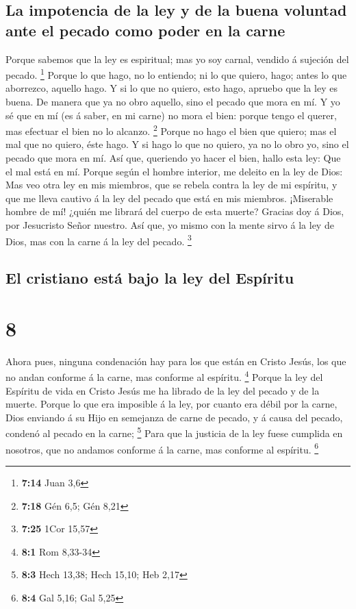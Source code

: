\hypertarget{la-impotencia-de-la-ley-y-de-la-buena-voluntad-ante-el-pecado-como-poder-en-la-carne}{%
\subsection{La impotencia de la ley y de la buena voluntad ante el
pecado como poder en la
carne}\label{la-impotencia-de-la-ley-y-de-la-buena-voluntad-ante-el-pecado-como-poder-en-la-carne}}

 Porque sabemos que la ley es espiritual; mas yo soy
carnal, vendido á sujeción del pecado. \footnote{\textbf{7:14} Juan 3,6}
 Porque lo que hago, no lo entiendo; ni lo que quiero,
hago; antes lo que aborrezco, aquello hago.  Y si lo que no
quiero, esto hago, apruebo que la ley es buena.  De manera
que ya no obro aquello, sino el pecado que mora en mí.  Y
yo sé que en mí (es á saber, en mi carne) no mora el bien: porque tengo
el querer, mas efectuar el bien no lo alcanzo. \footnote{\textbf{7:18}
  Gén 6,5; Gén 8,21}  Porque no hago el bien que quiero;
mas el mal que no quiero, éste hago.  Y si hago lo que no
quiero, ya no lo obro yo, sino el pecado que mora en mí. 
Así que, queriendo yo hacer el bien, hallo esta ley: Que el mal está en
mí.  Porque según el hombre interior, me deleito en la ley
de Dios:  Mas veo otra ley en mis miembros, que se rebela
contra la ley de mi espíritu, y que me lleva cautivo á la ley del pecado
que está en mis miembros.  ¡Miserable hombre de mí! ¿quién
me librará del cuerpo de esta muerte?  Gracias doy á Dios,
por Jesucristo Señor nuestro. Así que, yo mismo con la mente sirvo á la
ley de Dios, mas con la carne á la ley del pecado. \footnote{\textbf{7:25}
  1Cor 15,57}

\hypertarget{el-cristiano-estuxe1-bajo-la-ley-del-espuxedritu}{%
\subsection{El cristiano está bajo la ley del
Espíritu}\label{el-cristiano-estuxe1-bajo-la-ley-del-espuxedritu}}

\hypertarget{section-7}{%
\section{8}\label{section-7}}

 Ahora pues, ninguna condenación hay para los que están en
Cristo Jesús, los que no andan conforme á la carne, mas conforme al
espíritu. \footnote{\textbf{8:1} Rom 8,33-34}  Porque la ley
del Espíritu de vida en Cristo Jesús me ha librado de la ley del pecado
y de la muerte.  Porque lo que era imposible á la ley, por
cuanto era débil por la carne, Dios enviando á su Hijo en semejanza de
carne de pecado, y á causa del pecado, condenó al pecado en la carne;
\footnote{\textbf{8:3} Hech 13,38; Hech 15,10; Heb 2,17} 
Para que la justicia de la ley fuese cumplida en nosotros, que no
andamos conforme á la carne, mas conforme al espíritu. \footnote{\textbf{8:4}
  Gal 5,16; Gal 5,25}

